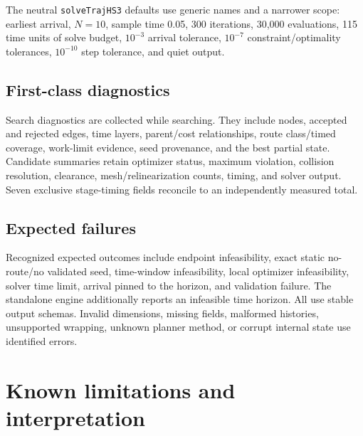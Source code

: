 \documentclass[10pt,letterpaper]{article}
\newcommand{\file}[1]{\nolinkurl{#1}}
\begin{document}
The neutral \file{solveTrajHS3} defaults use generic names and a narrower scope:
earliest arrival, $N=10$, sample time 0.05, 300 iterations, 30,000 evaluations,
115 time units of solve budget, $10^{-3}$ arrival tolerance, $10^{-7}$
constraint/optimality tolerances, $10^{-10}$ step tolerance, and quiet output.

\subsection{First-class diagnostics}

Search diagnostics are collected while searching. They include nodes, accepted
and rejected edges, time layers, parent/cost relationships, route class/timed
coverage, work-limit evidence, seed provenance, and the best partial state.
Candidate summaries retain optimizer status, maximum violation, collision
resolution, clearance, mesh/relinearization counts, timing, and solver output.
Seven exclusive stage-timing fields reconcile to an independently measured
total.

\subsection{Expected failures}

Recognized expected outcomes include endpoint infeasibility, exact static
no-route/no validated seed, time-window infeasibility, local optimizer
infeasibility, solver time limit, arrival pinned to the horizon, and validation
failure. The standalone engine additionally reports an infeasible time horizon.
All use stable output schemas. Invalid dimensions, missing fields, malformed
histories, unsupported wrapping, unknown planner method, or corrupt internal
state use identified errors.

\section{Known limitations and interpretation}\label{sec:limits}
\end{document}
